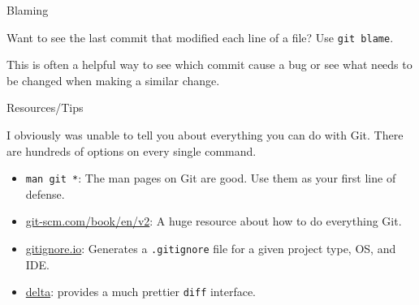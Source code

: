 \documentclass{beeper}
\begin{document}
\begin{frame}{Blaming}

    Want to see the last commit that modified each line of a file? Use
    \texttt{git blame}.

    This is often a helpful way to see which commit cause a bug or see what
    needs to be changed when making a similar change.

\end{frame}

\begin{frame}{Resources/Tips}

    I obviously was unable to tell you about everything you can do with Git.
    There are hundreds of options on every single command.

    \begin{itemize}
        \item \texttt{man git *}: The man pages on Git are good. Use them as your first line of
            defense.
        \item \href{https://git-scm.com/book/en/v2}{git-scm.com/book/en/v2}: A
            huge resource about how to do everything Git.
        \item \href{https://gitignore.io}{gitignore.io}: Generates a
            \texttt{.gitignore} file for a given project type, OS, and IDE.
        \item \href{https://github.com/dandavison/delta}{delta}: provides a much
            prettier \texttt{diff} interface.
    \end{itemize}
\end{frame}
\end{document}
